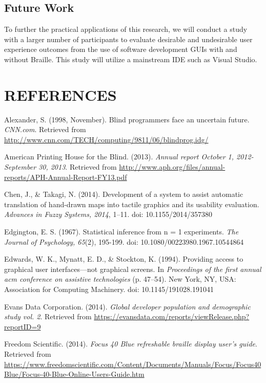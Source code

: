\documentclass[11.5pt]{sig-alternate} %
\begin{document}
\begin{large}
\subsection*{Future Work}

To further the practical applications of this research, we will conduct a study with a larger number of participants to evaluate desirable and undesirable user experience outcomes from the use of software development GUIs with and without Braille. This study will utilize a mainstream IDE such as Visual Studio. 

\end{large}

\clearpage
\section*{REFERENCES}\par 
\leftskip 0.25in
\parindent -0.25in 

Alexander, S. (1998, November). Blind programmers face an uncertain future. \textit{CNN.com}. Retrieved from \url{http://www.cnn.com/TECH/computing/9811/06/blindprog.idg/}

American Printing House for the Blind. (2013). \textit{Annual report October 1, 2012-September 30, 2013}. Retrieved from \url{http://www.aph.org/files/annual-reports/APH-Annual-Report-FY13.pdf}

Chen, J., \& Takagi, N. (2014). Development of a system to assist automatic translation of hand-drawn maps into tactile graphics and its usability evaluation. \textit{Advances in Fuzzy Systems, 2014}, 1–11. doi: 10.1155/2014/357380

Edgington, E. S. (1967). Statistical inference from n = 1 experiments. \textit{The Journal of Psychology, 65}(2), 195-199. doi: 10.1080/00223980.1967.10544864

Edwards, W. K., Mynatt, E. D., \& Stockton, K. (1994). Providing access to graphical user interfaces—not graphical screens. In \textit{Proceedings of the first annual acm conference on assistive technologies} (p. 47–54). New York, NY, USA: Association for Computing Machinery. doi: 10.1145/191028.191041

Evans Data Corporation. (2014). \textit{Global developer population and demographic study vol. 2}. Retrieved from \url{https://evansdata.com/reports/viewRelease.php?reportID=9}

Freedom Scientific. (2014). \textit{Focus 40 Blue refreshable braille display user’s guide}. Retrieved from \url{https://www.freedomscientific.com/Content/Documents/Manuals/Focus/Focus40Blue/Focus-40-Blue-Online-Users-Guide.htm} 
\end{document}
